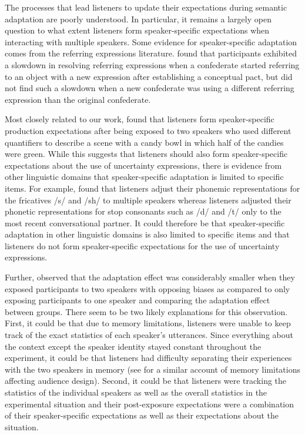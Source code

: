 The processes that lead listeners to update their expectations during semantic adaptation
are poorly understood. In particular, it remains a largely open question to what extent listeners form speaker-specific
expectations when interacting with multiple speakers. Some evidence for speaker-specific
adaptation comes from the referring expressions literature. \textcite{Metzing2003} found that 
participants exhibited a slowdown in resolving referring expressions
when a confederate started referring to an object with a new expression 
after establishing a conceptual pact, but did not find such a slowdown 
when a new confederate was using a different referring expression 
than the original confederate. 

Most closely related to our work, \textcite{Yildirim2016} found that listeners 
form speaker-specific production expectations after being exposed to 
two speakers who used different 
quantifiers to describe a scene with a candy bowl
in which half of the candies were green. While this suggests
that listeners should also form speaker-specific expectations
about the use of uncertainty expressions, there is evidence from
other linguistic domains that speaker-specific adaptation is limited to specific items.
For example, \textcite{Kraljic2007} found that listeners adjust their phonemic
representations for the fricatives /s/ and /sh/ to multiple speakers whereas listeners
adjusted their phonetic representations for stop consonants such as /d/ and /t/ only
to the most recent conversational partner. It could therefore be that speaker-specific adaptation
in other linguistic domains is also limited to specific items and that listeners do not
form speaker-specific expectations for the use of uncertainty expressions.

Further, \textcite{Yildirim2016} observed that the adaptation effect was considerably smaller
when they exposed participants to two speakers with opposing biases as compared 
to only exposing participants to one speaker and comparing the adaptation 
effect between groups. There seem to be two likely explanations for this observation.
First, it could be that due to memory limitations, listeners were unable 
to keep track of the exact statistics of each speaker's utterances. Since
everything about the context except the speaker identity stayed constant
throughout the experiment, it could be that listeners had difficulty 
separating their experiences with the two speakers in memory (see \textcite{Horton2005} for 
a similar account of memory limitations affecting audience design). Second, it
could be that listeners were tracking the statistics of the individual speakers as
well as the overall statistics in the experimental situation and their post-exposure
expectations were a combination of their speaker-specific expectations as well as 
their expectations about the situation.

